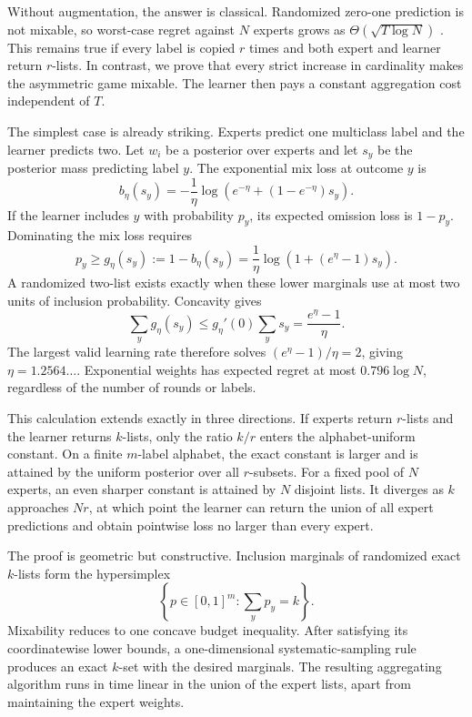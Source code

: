 \documentclass{article}
\theoremstyle{definition}
\theoremstyle{remark}
\newcommand{\1}{\mathbf 1}
\begin{document}
Without augmentation, the answer is classical. Randomized zero-one prediction is not mixable, so worst-case regret against \(N\) experts grows as \(\Theta(\sqrt{T\log N})\) \citep{cesabianchi2006prediction}. This remains true if every label is copied \(r\) times and both expert and learner return \(r\)-lists. In contrast, we prove that every strict increase in cardinality makes the asymmetric game mixable. The learner then pays a constant aggregation cost independent of \(T\).

The simplest case is already striking. Experts predict one multiclass label and the learner predicts two. Let \(w_i\) be a posterior over experts and let \(s_y\) be the posterior mass predicting label \(y\). The exponential mix loss at outcome \(y\) is \[ b_\eta(s_y) =-\frac1\eta\log\left(e^{-\eta}+(1-e^{-\eta})s_y\right). \] If the learner includes \(y\) with probability \(p_y\), its expected omission loss is \(1-p_y\). Dominating the mix loss requires \[ p_y\ge g_\eta(s_y) :=1-b_\eta(s_y) =\frac1\eta\log\left(1+(e^\eta-1)s_y\right). \] A randomized two-list exists exactly when these lower marginals use at most two units of inclusion probability. Concavity gives \[ \sum_y g_\eta(s_y) \le g_\eta'(0)\sum_y s_y =\frac{e^\eta-1}{\eta}. \] The largest valid learning rate therefore solves \((e^\eta-1)/\eta=2\), giving \(\eta=1.2564\ldots\). Exponential weights has expected regret at most \(0.796\log N\), regardless of the number of rounds or labels.

This calculation extends exactly in three directions. If experts return \(r\)-lists and the learner returns \(k\)-lists, only the ratio \(k/r\) enters the alphabet-uniform constant. On a finite \(m\)-label alphabet, the exact constant is larger and is attained by the uniform posterior over all \(r\)-subsets. For a fixed pool of \(N\) experts, an even sharper constant is attained by \(N\) disjoint lists. It diverges as \(k\) approaches \(Nr\), at which point the learner can return the union of all expert predictions and obtain pointwise loss no larger than every expert.

The proof is geometric but constructive. Inclusion marginals of randomized exact \(k\)-lists form the hypersimplex \[ \left\{p\in[0,1]^m:\sum_yp_y=k\right\}. \] Mixability reduces to one concave budget inequality. After satisfying its coordinatewise lower bounds, a one-dimensional systematic-sampling rule produces an exact \(k\)-set with the desired marginals. The resulting aggregating algorithm runs in time linear in the union of the expert lists, apart from maintaining the expert weights.
\end{document}
